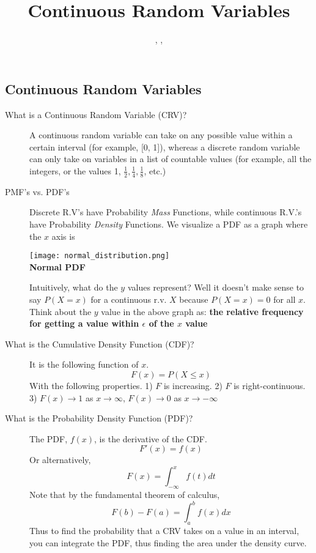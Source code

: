 \documentclass[11.5pt]{article}
\title{Continuous Random Variables}
\author{\justin, \michael, \creds}
\begin{document}
\maketitle

\begin{notes}
\section*{Continuous Random Variables}

\begin{description}
\item[What is a Continuous Random Variable (CRV)?] A continuous random variable can take on any possible value within a certain interval (for example, [0, 1]), whereas a discrete random variable can only take on variables in a list of countable values (for example, all the integers, or the values 1, $\frac{1}{2}, \frac{1}{4}, \frac{1}{8}$, etc.)
\item[PMF's vs. PDF's] Discrete R.V's have Probability \textit{Mass} Functions, while continuous R.V.'s have Probability \textit{Density} Functions. We visualize a PDF as a graph where the $x$ axis is
\begin{center}
\texttt{[image: normal\_distribution.png]}\\ 
\textbf{Normal PDF}
\end{center}

Intuitively, what do the $y$ values represent? Well it doesn't make sense to say $P(X = x)$ for a continuous r.v. $X$ because $P(X = x) = 0$ for all $x$. Think about the $y$ value in the above graph as: \textbf{the relative frequency for getting a value within $\epsilon$ of the $x$ value}
\item[What is the Cumulative Density Function (CDF)?] It is the following function of $x$.
		\[F(x) = P(X \leq x)\]
		With the following properties. 1) $F$ is increasing. 2) $F$ is right-continuous. 3) $F(x) \rightarrow 1$ as $x \rightarrow \infty$, $F(x) \rightarrow 0$ as $x \rightarrow -\infty$

\item[What is the Probability Density Function (PDF)?] The PDF, $f(x)$, is the derivative of the CDF. 
\[ F'(x) = f(x) \]
Or alternatively,
\[ F(x) = \int_{-\infty}^x f(t)dt \]
Note that by the fundamental theorem of calculus,
\[ F(b) - F(a) = \int^b_a f(x)dx \]
Thus to find the probability that a CRV takes on a value in an interval, you can integrate the PDF, thus finding the area under the density curve.


\end{description}
\end{notes}
\end{document}
